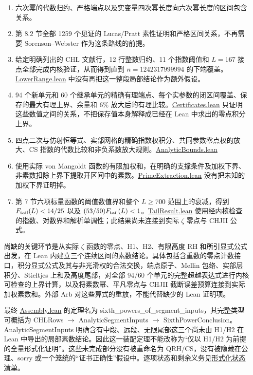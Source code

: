 \documentclass[UTF8,zihao=-4,fontset=fandol]{ctexart}
\begin{document}
\begin{enumerate}
\item 六次幂的代数归约、严格端点以及实变量四次幂长度向六次幂长度的区间包含关系。
\item 第 8.2 节全部 1259 个见证的 Lucas/Pratt 素性证明和严格区间关系，不再需要 Sorenson–Webster 作为这条路线的前提。
\item 给定明确列出的 CHL 文献行，12 行整数归约、11 个指数阈值和 \(L=167\) 接点全部完成内核验证，从而得到直到 \(n=1242317999994\) 的下端覆盖。\href{../lean/LegendreK6/LowerRange.lean}{LowerRange.lean} 中没有再把这一整段局部结论作为额外假设。
\item 94 个新单元和 60 个继承单元的精确有理端点、每个实参数的闭区间覆盖、保存的最大有理上界、余量和 6\% 放大后的有理比较。\href{../lean/LegendreK6/Certificates.lean}{Certificates.lean} 只证明这些数值之间的关系，不把保存值本身解释成已经在 Lean 中求出的零点积分上界。
\item 四点二次与仿射恒等式、实部网格的精确指数权积分、共同参数零点权的放大、CS 指数的代数比较和非负系数放大规则。\href{../lean/LegendreK6/AnalyticBounds.lean}{AnalyticBounds.lean}
\item 使用实际 von Mangoldt 函数的有限加权和，在明确的支撑条件及加权下界、非素数扣除上界下提取开区间中的素数。\href{../lean/LegendreK6/PrimeExtraction.lean}{PrimeExtraction.lean} 没有把未知的加权下界证明掉。
\item 第 7 节六项标量函数的阈值数值界和整个 \(L\ge700\) 范围上的衰减，得到 \(F_{\rm tail}(L)<14/25\) 以及 \((53/50)F_{\rm tail}(L)<1\)。\href{../lean/LegendreK6/TailResult.lean}{TailResult.lean} 使用经内核检查的指数、对数界和解析单调性；此结果尚未连接到实际 \(\zeta\) 零点与 CHJII 公式。
\end{enumerate}

尚缺的关键环节是从实际 \(\zeta\) 函数的零点、H1、H2、有限高度 RH 和所引显式公式出发，在 Lean 内建立三个连续区间的素数结论。具体包括含重数的零点计数接口，积分显式公式及其与非光滑权的合法交换，端点原子、Mellin 包络、实部层积分、Stieltjes 上和及高度尾部，对全部 94/60 个单元的完整超越表达式进行内核可检查的上界计算，以及将素数幂、平凡零点与 CHJII 截断误差预算连接到实际加权素数和。外部 Arb 对这些算式的重放，不能代替缺少的 Lean 证明项。

最终 \href{../lean/LegendreK6/Assembly.lean}{Assembly.lean} 的定理名为 sixth\_powers\_of\_segment\_inputs，其完整类型可概括为 CHLRows \(\to\) AnalyticSegmentInputs \(\to\) SixthPowerConclusion。AnalyticSegmentInputs 明确含有中段、远段、无限尾部这三个尚未由 H1/H2 在 Lean 中导出的局部素数结论。因此这一装配定理不能改称为“仅以 H1/H2 为前提的全量形式化证明”。这些未完成部分没有被重命名为 QRH/CS，没有被隐藏在公理、sorry 或一个笼统的“证书正确性”假设中。逐项状态和剩余义务见\href{../FORMALIZATION_STATUS.md}{形式化状态清单}。
\end{document}
